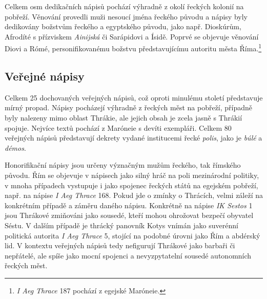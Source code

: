 Celkem osm dedikačních nápisů pochází výhradně z okolí řeckých kolonií na pobřeží. Věnování provedli muži nesoucí jména řeckého původu a nápisy byly dedikovány božstvům řeckého a egyptského původu, jako např. Dioskúrům, Afrodíté s přízviskem {\em Ainijská} či Sarápidovi a Ísidě. Poprvé se objevuje věnování Diovi a Rómé, personifikovanému božstvu představujícímu autoritu města Říma.\footnote{{\em I Aeg Thrace} 187 pochází z egejské Maróneie.}

\subsection[veřejné-nápisy-7]{Veřejné nápisy}

Celkem 25 dochovaných veřejných nápisů, což oproti minulému století představuje mírný propad. Nápisy pocházejí výhradně z řeckých měst na pobřeží, případně byly nalezeny mimo oblast Thrákie, ale jejich obsah je zcela jasně s Thrákií spojuje. Nejvíce textů pochází z Maróneie s devíti exempláři. Celkem 80  veřejných nápisů představují dekrety vydané institucemi řecké {\em polis}, jako je {\em búlé} a {\em démos}.

Honorifikační nápisy jsou určeny význačným mužům řeckého, tak římského původu. Řím se objevuje v nápisech jako silný hráč na poli mezinárodní politiky, v mnoha případech vystupuje i jako spojenec řeckých států na egejském pobřeží, např. na nápise {\em I Aeg Thrace} 168. Pokud jde o zmínky o Thrácích, velmi záleží na konkrétním případě a záměru daného nápisu. Konkrétně na nápise {\em IK Sestos} 1 jsou Thrákové zmiňováni jako sousedé, kteří mohou ohrožovat bezpečí obyvatel Séstu. V dalším případě je thrácký panovník Kotys vnímán jako suverénní politická autorita {\em I Aeg Thrace} 5, stojící na podobné úrovni jako Řím a abdérský lid. V kontextu veřejných nápisů tedy nefigurují Thrákové jako barbaři či nepřátelé, ale spíše jako mocní spojenci a nevyzpytatelní sousedé autonomních řeckých měst.

